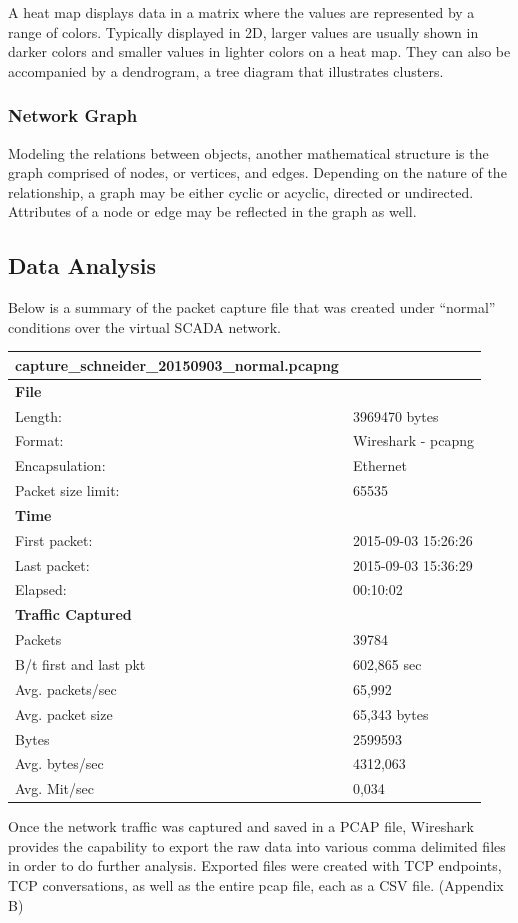 \documentclass[11pt,a4paper]{article}
\begin{document}
A heat map displays data in a matrix where the values are represented by
a range of colors. Typically displayed in 2D, larger values are usually
shown in darker colors and smaller values in lighter colors on a heat
map. They can also be accompanied by a dendrogram, a tree diagram that
illustrates clusters.

\subsubsection{Network Graph}\label{network-graph}

Modeling the relations between objects, another mathematical structure
is the graph comprised of nodes, or vertices, and edges. Depending on
the nature of the relationship, a graph may be either cyclic or acyclic,
directed or undirected. Attributes of a node or edge may be reflected in
the graph as well.

\subsection{Data Analysis}\label{data-analysis}

Below is a summary of the packet capture file that was created under
``normal'' conditions over the virtual SCADA network.

\begin{longtable}[c]{@{}ll@{}}
\toprule
\textbf{capture\_schneider\_20150903\_normal.pcapng} &\tabularnewline
\midrule
\endhead
\textbf{File} &\tabularnewline
Length: & 3969470 bytes\tabularnewline
Format: & Wireshark - pcapng\tabularnewline
Encapsulation: & Ethernet\tabularnewline
Packet size limit: & 65535\tabularnewline
\textbf{Time} &\tabularnewline
First packet: & 2015-09-03 15:26:26\tabularnewline
Last packet: & 2015-09-03 15:36:29\tabularnewline
Elapsed: & 00:10:02\tabularnewline
\textbf{Traffic Captured} &\tabularnewline
Packets & 39784\tabularnewline
B/t first and last pkt & 602,865 sec\tabularnewline
Avg. packets/sec & 65,992\tabularnewline
Avg. packet size & 65,343 bytes\tabularnewline
Bytes & 2599593\tabularnewline
Avg. bytes/sec & 4312,063\tabularnewline
Avg. Mit/sec & 0,034\tabularnewline
\bottomrule
\end{longtable}

Once the network traffic was captured and saved in a PCAP file,
Wireshark provides the capability to export the raw data into various
comma delimited files in order to do further analysis. Exported files
were created with TCP endpoints, TCP conversations, as well as the
entire pcap file, each as a CSV file. (Appendix B)
\end{document}
